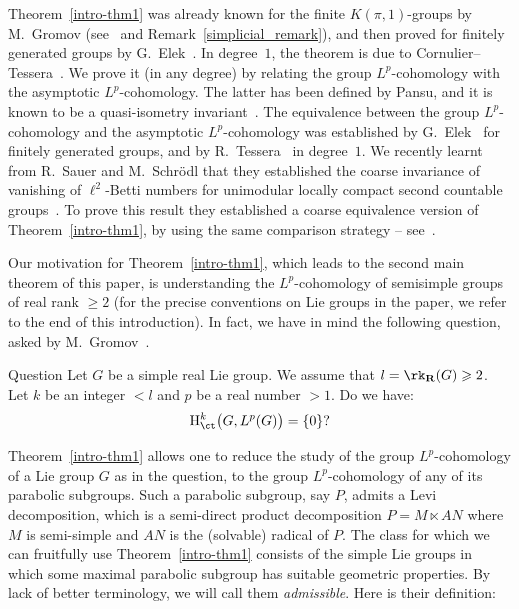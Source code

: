 Theorem~\ref{intro-thm1} was already known for the finite $K(\pi, 1)$-groups by M.~Gromov (see~\cite[p.~219]{G} and Remark~\ref{simplicial_remark}), and then proved for finitely generated groups by G.~Elek~\cite{Elek}. In degree~$1$, the theorem is due to Cornulier--Tessera~\cite{CT}. We prove it (in any degree) by relating the group $L^p$-cohomology with the asymptotic $L^p$-cohomology. The latter has been defined by Pansu, and it is known to be a quasi-isometry invariant~\cite{Pa95}. The equivalence between the group $L^p$-cohomology and the asymptotic $L^p$-cohomology was established by G.~Elek~\cite{Elek} for finitely generated groups, and by R.~Tessera~\cite{T} in degree~$1$. We recently learnt from R.~Sauer and M.~Schr\"odl that they established the coarse invariance of vanishing of $\ell^2$-Betti numbers for unimodular locally compact second countable groups~\cite{SaSc}. To prove this result they established a coarse equivalence version of Theorem~\ref{intro-thm1}, by using the same comparison strategy -- see~\cite[Theorem~12]{SaSc}.

Our motivation for Theorem~\ref{intro-thm1}, which leads to the second main theorem of this paper, is understanding the $L^p$-cohomology of semisimple groups of real rank $\geqslant 2$ (for the precise conventions on Lie groups in the paper, we refer to the end of this introduction). In fact, we have in mind the following question, asked by M.~Gromov~\cite[p.~253]{G}.


\begin{enonce}[plain]{Question}
Let $G$ be a simple real Lie group. We assume that $l=\rk_{\bf R} (G)\linebreak\geqslant 2$. Let $k$ be an integer $<l$ and $p$ be a real number $>1$. Do we have:
\[
{\rm H}^k_{\ct} \bigl(G, L^p(G) \bigr) = \{0\}?
\]
\end{enonce}


Theorem~\ref{intro-thm1} allows one to reduce the study of the group $L^p$-cohomology of a Lie group $G$ as in the question, to the group $L^p$-cohomology of any of its parabolic subgroups. Such a parabolic subgroup, say $P$, admits a Levi decomposition, which is a semi-direct product decomposition $P = M \ltimes AN$ where $M$ is semi-simple and $AN$ is the (solvable) radical of $P$. The class for which we can fruitfully use Theorem~\ref{intro-thm1} consists of the simple Lie groups in which some maximal parabolic subgroup has suitable geometric properties. By lack of better terminology, we will call them \emph{admissible}. Here is their definition:

